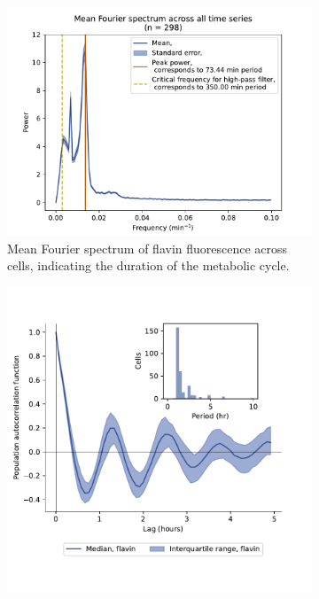 \begin{figure}
  \begin{subfigure}[htpb]{0.4\textwidth}
   \centering
   \includegraphics[width=\textwidth]{by4741_491_13}
   \caption{
    Mean Fourier spectrum of flavin fluorescence across cells, indicating the duration of the metabolic cycle.
   }
   \label{fig:biology-by4741-sync-fourier}
  \end{subfigure}%
  \begin{subfigure}[htpb]{0.4\textwidth}
   \centering
   \includegraphics[width=\textwidth]{by4741_491_12}

\end{subfigure}
\end{figure}
